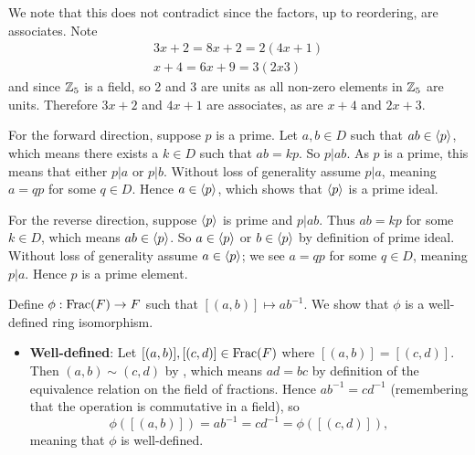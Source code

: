 \begin{questions}
    We note that this does not contradict  since the factors, up to reordering, are associates. Note
    \begin{align*}
        3x+2 = 8x+2 = 2(4x+1)\\
        x+4 = 6x+9 = 3(2x3)
    \end{align*}
    and since $\mathbb{Z}_5$ is a field, so 2 and 3 are units as all non-zero elements in $\mathbb{Z}_5$ are units. Therefore $3x+2$ and $4x+1$ are associates, as are $x+4$ and $2x+3$.

    \item For the forward direction, suppose $p$ is a prime. Let $a, b \in D$ such that $ab \in \left\langle p\right\rangle$, which means there exists a $k \in D$ such that $ab = kp$. So $p \vert ab$. As $p$ is a prime, this means that either $p \vert a$ or $p \vert b$. Without loss of generality assume $p \vert a$, meaning $a = qp$ for some $q \in D$. Hence $a \in \left\langle p\right\rangle$, which shows that $\left\langle p\right\rangle$ is a prime ideal.

    For the reverse direction, suppose $\left\langle p\right\rangle$ is prime and $p \vert ab$. Thus $ab = kp$ for some $k \in D$, which means $ab \in \left\langle p\right\rangle$. So $a \in \left\langle p\right\rangle$ or $b \in \left\langle p\right\rangle$ by definition of prime ideal. Without loss of generality assume $a \in \left\langle p\right\rangle$; we see $a = qp$ for some $q \in D$, meaning $p \vert a$. Hence $p$ is a prime element.

    \item Define $\phi: \mathrm{Frac}(F) \to F$ such that $[(a,b)]\mapsto ab^{-1}$. We show that $\phi$ is a well-defined ring isomorphism.
    \begin{itemize}
        \item \textbf{Well-defined}: Let $[(a,b)], [(c,d)] \in \mathrm{Frac}(F)$ where $[(a,b)] = [(c,d)]$. Then $(a,b) \mathrel{\sim} (c,d)$ by , which means $ad = bc$ by definition of the equivalence relation on the field of fractions. Hence $ab^{-1} = cd^{-1}$ (remembering that the operation is commutative in a field), so
        \[
            \phi([(a,b)]) = ab^{-1} = cd^{-1} = \phi([(c,d)]),
        \]
        meaning that $\phi$ is well-defined.


\end{itemize}
\end{questions}
